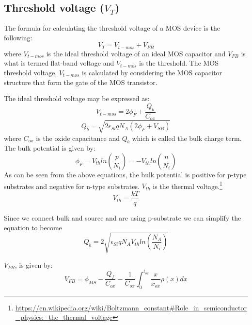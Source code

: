 \subsection{Threshold voltage ($V_T$)}\label{transistor_threshold_calculation}
The formula for calculating the threshold voltage of a MOS device is the following:
\begin{equation}
V_T = V_{t-mos} + V_{FB}
\end{equation}
where $V_{t-mos}$ is the ideal threshold voltage of an ideal MOS capacitor and $V_{FB}$ is what is termed flat-band voltage and $V_{t-mos}$ is the threshold.
The MOS threshold voltage, $V_{t-mos}$ is calculated by considering the MOS capacitor structure that form the gate of the MOS transistor.

The ideal threshold voltage may be expressed as:
\begin{equation}
V_{t-mos}=2 \phi_F + \frac{Q_b}{C_{ox}}
\end{equation}
\begin{equation}
Q_b
=
\sqrt{2 \epsilon_{Si} q N_A ( 2 \phi_F + V_{SB}) }
\end{equation}
where $C_{ox}$ is the oxide capacitance and $Q_b$ which is called the bulk charge term.\\

The bulk potential is given by:
\begin{equation}
\phi_F
=
V_{th} ln\left(\frac{p}{N_i}\right)
=
-V_{th} ln\left(\frac{n}{N_i}\right)
\end{equation}
As can be seen from the above equations, the bulk potential is positive for p-type substrates and negative for n-type substrates.
$V_{th}$ is the thermal voltage.\footnote{\url{https://en.wikipedia.org/wiki/Boltzmann_constant\#Role_in_semiconductor_physics:_the_thermal_voltage}}
\begin{equation}
V_{th} = \frac{k T}{q} 
\end{equation}

Since we connect bulk and source and are using p-substrate we can simplify the equation to become
\begin{equation}
Q_b
=
2 \sqrt{\epsilon_{Si} q N_A V_{th} ln\left(\frac{N_A}{N_i}\right) }
\end{equation}


$V_{FB}$, is given by:
\begin{equation}
V_{FB}
=
\phi_{MS}-\frac{Q_f}{C_{ox}}-\frac{1}{C_{ox}}\int_{0}^{t_{ox}}\frac{x}{x_{ox}}\rho(x) dx
\end{equation}

